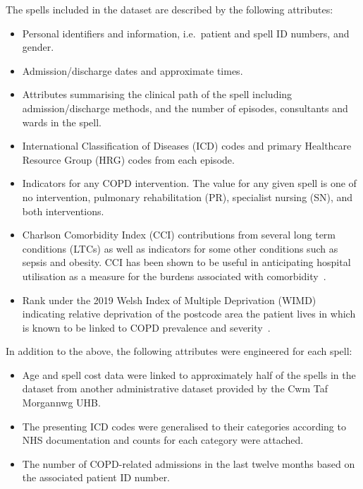 The spells included in the dataset are described by the following attributes:
\begin{itemize}
    \item Personal identifiers and information, i.e.\ patient and spell ID
        numbers, and gender.
    \item Admission/discharge dates and approximate times.
    \item Attributes summarising the clinical path of the spell including
        admission/discharge methods, and the number of episodes, consultants and
        wards in the spell.
    \item International Classification of Diseases (ICD) codes and primary
        Healthcare Resource Group (HRG) codes from each episode.
    \item Indicators for any COPD intervention. The value for any given spell is
        one of no intervention, pulmonary rehabilitation (PR), specialist
        nursing (SN), and both interventions.
    \item Charlson Comorbidity Index (CCI) contributions from several long term
        conditions (LTCs) as well as indicators for some other conditions such
        as sepsis and obesity. CCI has been shown to be useful in anticipating
        hospital utilisation as a measure for the burdens associated with
        comorbidity~\cite{Simon2011}.
    \item Rank under the 2019 Welsh Index of Multiple Deprivation (WIMD)
        indicating relative deprivation of the postcode area the patient lives
        in which is known to be linked to COPD prevalence and
        severity~\cite{Collins2018,Sexton2016,Steiner2017}.
\end{itemize}

In addition to the above, the following attributes were engineered for each
spell:
\begin{itemize}
    \item Age and spell cost data were linked to approximately half of the
        spells in the dataset from another administrative dataset provided by
        the Cwm Taf Morgannwg UHB.\
    \item The presenting ICD codes were generalised to their categories
        according to NHS documentation and counts for each category were
        attached.
    \item The number of COPD-related admissions in the last twelve months based
        on the associated patient ID number.
\end{itemize}

